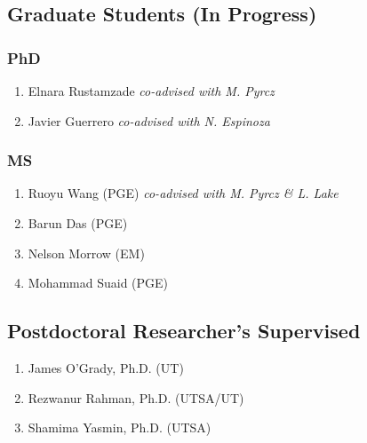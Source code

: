 \subsection*{Graduate Students (In Progress)}



\subsubsection*{PhD}
\begin{enumerate}
    \item Elnara Rustamzade \emph{co-advised with M. Pyrcz}
    \item Javier Guerrero \emph{co-advised with N. Espinoza}
\end{enumerate}

\subsubsection*{MS}
\begin{enumerate}
    \item Ruoyu Wang (PGE) \emph{co-advised with M. Pyrcz \& L. Lake}
    \item Barun Das (PGE) 
    \item Nelson Morrow (EM) 
    \item Mohammad Suaid (PGE) 
\end{enumerate}

\subsection*{Postdoctoral Researcher's Supervised}
  \begin{enumerate}
      \item James O'Grady, Ph.D. (UT)
      \item Rezwanur Rahman, Ph.D. (UTSA/UT)
      \item Shamima Yasmin, Ph.D. (UTSA)
  \end{enumerate}

